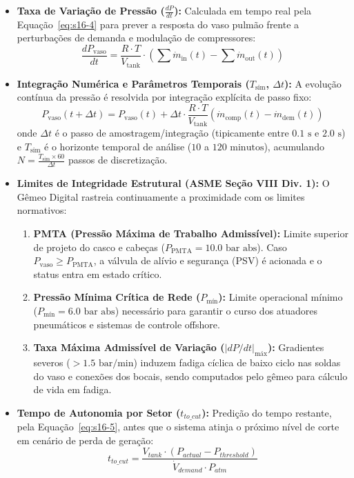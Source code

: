 \documentclass[12pt,a4paper]{article}
\numberwithin{equation}{section}
\numberwithin{table}{section}
\numberwithin{figure}{section}
\begin{document}
{\begin{itemize}
	\item \textbf{Taxa de Variação de Pressão ($\frac{dP}{dt}$):}
	Calculada em tempo real pela Equação~\eqref{eq:s16-4} para prever a resposta do vaso pulmão frente a perturbações de demanda e modulação de compressores:
	\begin{equation}\label{eq:s16-4}
\frac{dP_{\text{vaso}}}{dt} = \frac{R \cdotp T}{V_{\text{tank}}} \cdotp \left( \sum \dot{m}_{\text{in}}(t) - \sum \dot{m}_{\text{out}}(t) \right)
\end{equation}
	\item \textbf{Integração Numérica e Parâmetros Temporais ($T_{\text{sim}}$, $\Delta t$):}
	A evolução contínua da pressão é resolvida por integração explícita de passo fixo:
	\begin{equation}\label{eq:s16-4b}
P_{\text{vaso}}(t + \Delta t) = P_{\text{vaso}}(t) + \Delta t \cdot \frac{R \cdot T}{V_{\text{tank}}} \left( \dot{m}_{\text{comp}}(t) - \dot{m}_{\text{dem}}(t) \right)
\end{equation}
	onde $\Delta t$ é o passo de amostragem/integração (tipicamente entre $0.1\text{ s}$ e $2.0\text{ s}$) e $T_{\text{sim}}$ é o horizonte temporal de análise ($10$ a $120\text{ minutos}$), acumulando $N = \frac{T_{\text{sim}} \times 60}{\Delta t}$ passos de discretização.
	\item \textbf{Limites de Integridade Estrutural (ASME Seção VIII Div. 1):}
	O Gêmeo Digital rastreia continuamente a proximidade com os limites normativos:
	\begin{enumerate}
		\item \textbf{PMTA (Pressão Máxima de Trabalho Admissível):} Limite superior de projeto do casco e cabeças ($P_{\text{PMTA}} = 10.0\text{ bar abs}$). Caso $P_{\text{vaso}} \ge P_{\text{PMTA}}$, a válvula de alívio e segurança (PSV) é acionada e o status entra em estado crítico.
		\item \textbf{Pressão Mínima Crítica de Rede ($P_{\text{mín}}$):} Limite operacional mínimo ($P_{\text{mín}} = 6.0\text{ bar abs}$) necessário para garantir o curso dos atuadores pneumáticos e sistemas de controle offshore.
		\item \textbf{Taxa Máxima Admissível de Variação ($|dP/dt|_{\text{máx}}$):} Gradientes severos ($> 1.5\text{ bar/min}$) induzem fadiga cíclica de baixo ciclo nas soldas do vaso e conexões dos bocais, sendo computados pelo gêmeo para cálculo de vida em fadiga.
	\end{enumerate}
	\item \textbf{Tempo de Autonomia por Setor ($t_{to\_cut}$):}
	Predição do tempo restante, pela Equação~\eqref{eq:s16-5}, antes que o sistema atinja o próximo nível de corte em cenário de perda de geração:
	\begin{equation}\label{eq:s16-5}
t_{to\_cut} = \frac{V_{tank} \cdotp (P_{actual} - P_{threshold})}{\dot{V}_{demand} \cdotp P_{atm}}
\end{equation}
\end{itemize}

}
\end{document}

